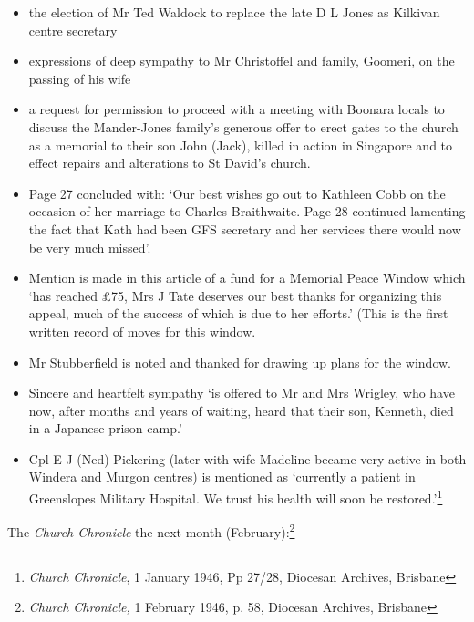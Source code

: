 \begin{itemize}
\item
  the election of Mr Ted Waldock to replace the late D L Jones as
  Kilkivan centre secretary
\item
  expressions of deep sympathy to Mr Christoffel and family, Goomeri, on
  the passing of his wife
\item
  a request for permission to proceed with a meeting with Boonara locals
  to discuss the Mander-Jones family's generous offer to erect gates to
  the church as a memorial to their son John (Jack), killed in action in
  Singapore and to effect repairs and alterations to St David's church.
\item
  Page 27 concluded with: `Our best wishes go out to Kathleen Cobb on
  the occasion of her marriage to Charles Braithwaite. Page 28 continued
  lamenting the fact that Kath had been GFS secretary and her services
  there would now be very much missed'.
\item
  Mention is made in this article of a fund for a Memorial Peace Window
  which `has reached \pounds75, Mrs J Tate deserves our best thanks for
  organizing this appeal, much of the success of which is due to her
  efforts.' (This is the first written record of moves for this window.
\item
  Mr Stubberfield is noted and thanked for drawing up plans for the
  window.
\item
  Sincere and heartfelt sympathy `is offered to Mr and Mrs Wrigley, who
  have now, after months and years of waiting, heard that their son,
  Kenneth, died in a Japanese prison camp.'
\item
  Cpl E J (Ned) Pickering (later with wife Madeline became very active
  in both Windera and Murgon centres) is mentioned as `currently a
  patient in Greenslopes Military Hospital. We trust his health will
  soon be restored.'\footnote{\emph{Church Chronicle}, 1 January 1946,
    Pp 27/28, Diocesan Archives, Brisbane}
\end{itemize}

The \emph{Church Chronicle} the next month (February):\footnote{\emph{Church
  Chronicle,} 1 February 1946, p. 58, Diocesan Archives, Brisbane}

